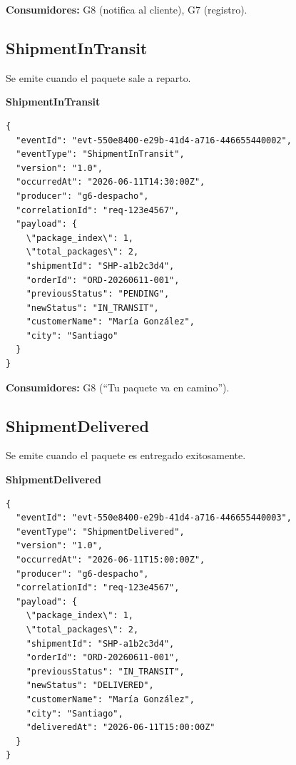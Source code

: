 \documentclass[11pt, a4paper]{article}
\newcommand{\contractheader}[1]{%
  \noindent\colorbox{primary!10}{%
    \parbox{\dimexpr\textwidth-2\fboxsep}{%
      \textbf{\faFileCode\quad #1}%
    }%
  }
  \vspace{0.3cm}
}
\begin{document}
\textbf{Consumidores:} G8 (notifica al cliente), G7 (registro).

\vspace{0.4cm}

\subsection{ShipmentInTransit}

Se emite cuando el paquete sale a reparto.

\contractheader{ShipmentInTransit}

\begin{lstlisting}
{
  "eventId": "evt-550e8400-e29b-41d4-a716-446655440002",
  "eventType": "ShipmentInTransit",
  "version": "1.0",
  "occurredAt": "2026-06-11T14:30:00Z",
  "producer": "g6-despacho",
  "correlationId": "req-123e4567",
  "payload": {
    \"package_index\": 1,
    \"total_packages\": 2,
    "shipmentId": "SHP-a1b2c3d4",
    "orderId": "ORD-20260611-001",
    "previousStatus": "PENDING",
    "newStatus": "IN_TRANSIT",
    "customerName": "María González",
    "city": "Santiago"
  }
}
\end{lstlisting}

\textbf{Consumidores:} G8 (``Tu paquete va en camino'').

\vspace{0.4cm}

\subsection{ShipmentDelivered}

Se emite cuando el paquete es entregado exitosamente.

\contractheader{ShipmentDelivered}

\begin{lstlisting}
{
  "eventId": "evt-550e8400-e29b-41d4-a716-446655440003",
  "eventType": "ShipmentDelivered",
  "version": "1.0",
  "occurredAt": "2026-06-11T15:00:00Z",
  "producer": "g6-despacho",
  "correlationId": "req-123e4567",
  "payload": {
    \"package_index\": 1,
    \"total_packages\": 2,
    "shipmentId": "SHP-a1b2c3d4",
    "orderId": "ORD-20260611-001",
    "previousStatus": "IN_TRANSIT",
    "newStatus": "DELIVERED",
    "customerName": "María González",
    "city": "Santiago",
    "deliveredAt": "2026-06-11T15:00:00Z"
  }
}
\end{lstlisting}
\end{document}
